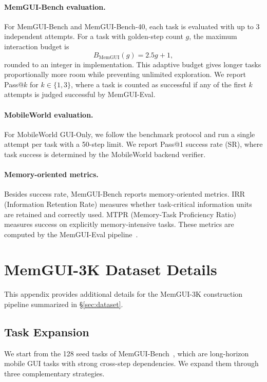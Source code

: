 \documentclass{llmxive}
\begin{document}
\paragraph{MemGUI-Bench evaluation.}
For MemGUI-Bench and MemGUI-Bench-40, each task is evaluated with up to 3 independent attempts. For a task with golden-step count $g$, the maximum interaction budget is
\[
B_{\mathrm{MemGUI}}(g) = 2.5g + 1,
\]
rounded to an integer in implementation. This adaptive budget gives longer tasks proportionally more room while preventing unlimited exploration. We report Pass@$k$ for $k{\in}\{1,3\}$, where a task is counted as successful if any of the first $k$ attempts is judged successful by MemGUI-Eval.

\paragraph{MobileWorld evaluation.}
For MobileWorld GUI-Only, we follow the benchmark protocol and run a single attempt per task with a 50-step limit. We report Pass@1 success rate (SR), where task success is determined by the MobileWorld backend verifier.

\paragraph{Memory-oriented metrics.}
Besides success rate, MemGUI-Bench reports memory-oriented metrics. IRR (Information Retention Rate) measures whether task-critical information units are retained and correctly used. MTPR (Memory-Task Proficiency Ratio) measures success on explicitly memory-intensive tasks. These metrics are computed by the MemGUI-Eval pipeline~\cite{liu2026memgui}.

\section{MemGUI-3K Dataset Details}
\label{sec:appendix-dataset}

This appendix provides additional details for the MemGUI-3K construction pipeline summarized in \S\ref{sec:dataset}.

\subsection{Task Expansion}
\label{sec:appendix-task-expansion}

We start from the 128 seed tasks of MemGUI-Bench~\cite{liu2026memgui}, which are long-horizon mobile GUI tasks with strong cross-step dependencies. We expand them through three complementary strategies.
\end{document}
